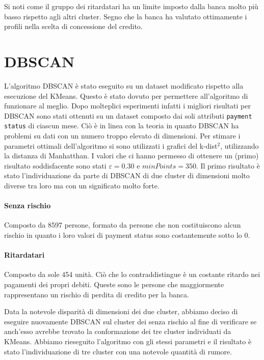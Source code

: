 Si noti come il gruppo dei ritardatari ha un limite imposto dalla banca molto pi\`u basso rispetto agli altri cluster. Segno che la banca ha valutato ottimamente i profili nella scelta di concessione del credito.

\section{DBSCAN}L'algoritmo DBSCAN \`e stato eseguito su un dataset
modificato rispetto alla esecuzione del KMeans.
Questo \`e stato dovuto per permettere all'algoritmo
di funzionare al meglio. Dopo molteplici esperimenti
infatti i migliori risultati per DBSCAN sono stati ottenuti
su un dataset composto dai soli attributi 
\texttt{payment status} di ciascun mese. Ci\`o \`e in linea
con la teoria in quanto DBSCAN ha problemi su dati con un 
numero troppo elevato di dimensioni.
Per stimare i parametri ottimali dell'algoritmo si sono
utilizzati i grafici del k-dist$^2$, utilizzando la 
distanza di Manhatthan. I valori che ci hanno permesso di
ottenere un (primo) risultato soddisfacente sono stati
$\varepsilon=0.30$ e $minPoints=350$.
Il primo risultato \`e stato l'individuazione da parte
di DBSCAN di due cluster di dimensioni molto diverse tra
loro ma con un significato molto forte.

\paragraph{Senza rischio}
Composto da 8597 persone, formato da persone che non
costituiscono alcun rischio in quanto i loro valori 
di payment status sono costantemente sotto lo 0.

\paragraph{Ritardatari}
Composto da sole 454 unit\`a. Ci\`o che lo contraddistingue
\`e un costante ritardo nei pagamenti dei propri debiti.
Queste sono le persone che maggiormente rappresentano
un rischio di perdita di credito per la banca.

Data la notevole disparit\`a di dimensioni dei due cluster, 
abbiamo deciso di eseguire nuovamente DBSCAN sul cluster
dei senza rischio al fine di verificare se anch'esso avrebbe
trovato la conformazione dei tre cluster individuati da KMeans.
Abbiamo rieseguito l'algoritmo con gli stessi parametri e il
risultato \`e stato l'individuazione di tre cluster con una 
notevole quantit\`a di rumore. 

